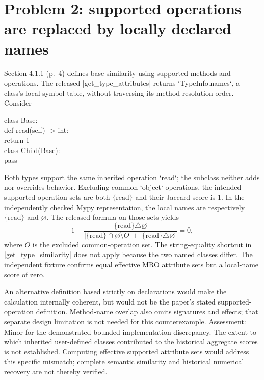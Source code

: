 \documentclass[10pt]{article}
\begin{document}
\section*{Problem 2: supported operations are replaced by locally declared names}
Section 4.1.1 (p. 4) defines base similarity using supported methods and operations. The released |get\_type\_attributes| returns `TypeInfo.names`, a class’s local symbol table, without traversing its method-resolution order. Consider\par
{\ttfamily\footnotesize class Base:\\
    def read(self) -> int:\\
        return 1\\
class Child(Base):\\
    pass}\par
Both types support the same inherited operation `read`; the subclass neither adds nor overrides behavior. Excluding common `object` operations, the intended supported-operation sets are both \(\{\mathrm{read}\}\) and their Jaccard score is \(1\). In the independently checked Mypy representation, the local names are respectively \(\{\mathrm{read}\}\) and \(\varnothing\). The released formula on those sets yields \[1-\frac{|\{\mathrm{read}\}\triangle\varnothing|}
 {|\{\mathrm{read}\}\cap\varnothing\setminus O|
  +|\{\mathrm{read}\}\triangle\varnothing|}=0,\] where \(O\) is the excluded common-operation set. The string-equality shortcut in |get\_type\_similarity| does not apply because the two named classes differ. The independent fixture confirms equal effective MRO attribute sets but a local-name score of zero.\par
An alternative definition based strictly on declarations would make the calculation internally coherent, but would not be the paper’s stated supported-operation definition. Method-name overlap also omits signatures and effects; that separate design limitation is not needed for this counterexample. Assessment: Minor for the demonstrated bounded implementation discrepancy. The extent to which inherited user-defined classes contributed to the historical aggregate scores is not established. Computing effective supported attribute sets would address this specific mismatch; complete semantic similarity and historical numerical recovery are not thereby verified.\par
\end{document}
